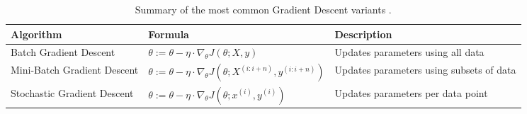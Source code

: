 \begin{table}[htb!]
\centering
\footnotesize
\begin{tabularx}{\textwidth}{@{}lXl@{}}
\toprule
\textbf{Algorithm} & \textbf{Formula} & \textbf{Description} \\
\midrule
Batch Gradient Descent & \(\theta := \theta - \eta \cdot \nabla_{\theta} J(\theta; X, y)\) & Updates parameters using all data \\
\addlinespace
Mini-Batch Gradient Descent & \(\theta := \theta - \eta \cdot \nabla_{\theta} J(\theta; X^{(i:i+n)}, y^{(i:i+n)})\) & Updates parameters using subsets of data \\
\addlinespace
Stochastic Gradient Descent & \(\theta := \theta - \eta \cdot \nabla_{\theta} J(\theta; x^{(i)}, y^{(i)})\) & Updates parameters per data point \\
\bottomrule
\end{tabularx}
\caption{Summary of the most common Gradient Descent variants \cite{goodfellow_deep_2016}.}
\label{Tables:GradientDescent}
\end{table}
